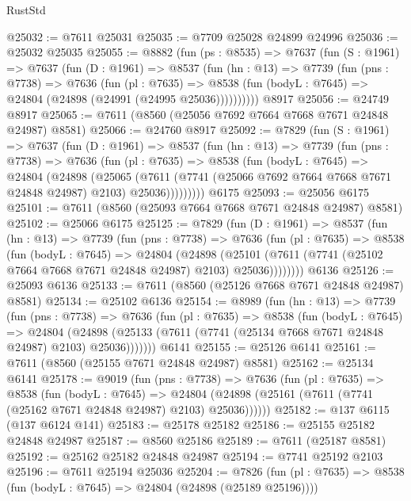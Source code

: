 \begin{lexlean}{RustStd}
\begin{coremodule}
{\begin{coremodule}
{{{{{{{{{{{{{{{{{{{{{{{{{{{{{{{{{{@25032 := @7611 @25031
@25035 := @7709 @25028 @24899 @24996
@25036 := @25032 @25035
@25055 := @8882
    (fun (ps : @8535) =>
    @7637
      (fun (S : @1961) =>
      @7637
        (fun (D : @1961) =>
        @8537
          (fun (hn : @13) =>
          @7739
            (fun (pns : @7738) =>
            @7636
              (fun (pl : @7635) =>
              @8538 (fun (bodyL : @7645) => @24804 (@24898 (@24991 (@24995 @25036))))))))))
    @8917
@25056 := @24749 @8917
@25065 := @7611 (@8560 (@25056 @7692 @7664 @7668 @7671 @24848 @24987) @8581)
@25066 := @24760 @8917
@25092 := @7829
    (fun (S : @1961) =>
    @7637
      (fun (D : @1961) =>
      @8537
        (fun (hn : @13) =>
        @7739
          (fun (pns : @7738) =>
          @7636
            (fun (pl : @7635) =>
            @8538
              (fun (bodyL : @7645) =>
              @24804
                (@24898
                  (@25065
                    (@7611
                      (@7741 (@25066 @7692 @7664 @7668 @7671 @24848 @24987) @2103)
                      @25036)))))))))
    @6175
@25093 := @25056 @6175
@25101 := @7611 (@8560 (@25093 @7664 @7668 @7671 @24848 @24987) @8581)
@25102 := @25066 @6175
@25125 := @7829
    (fun (D : @1961) =>
    @8537
      (fun (hn : @13) =>
      @7739
        (fun (pns : @7738) =>
        @7636
          (fun (pl : @7635) =>
          @8538
            (fun (bodyL : @7645) =>
            @24804
              (@24898
                (@25101 (@7611 (@7741 (@25102 @7664 @7668 @7671 @24848 @24987) @2103) @25036))))))))
    @6136
@25126 := @25093 @6136
@25133 := @7611 (@8560 (@25126 @7668 @7671 @24848 @24987) @8581)
@25134 := @25102 @6136
@25154 := @8989
    (fun (hn : @13) =>
    @7739
      (fun (pns : @7738) =>
      @7636
        (fun (pl : @7635) =>
        @8538
          (fun (bodyL : @7645) =>
          @24804
            (@24898 (@25133 (@7611 (@7741 (@25134 @7668 @7671 @24848 @24987) @2103) @25036)))))))
    @6141
@25155 := @25126 @6141
@25161 := @7611 (@8560 (@25155 @7671 @24848 @24987) @8581)
@25162 := @25134 @6141
@25178 := @9019
    (fun (pns : @7738) =>
    @7636
      (fun (pl : @7635) =>
      @8538
        (fun (bodyL : @7645) =>
        @24804 (@24898 (@25161 (@7611 (@7741 (@25162 @7671 @24848 @24987) @2103) @25036))))))
@25182 := @137 @6115 (@137 @6124 @141)
@25183 := @25178 @25182
@25186 := @25155 @25182 @24848 @24987
@25187 := @8560 @25186
@25189 := @7611 (@25187 @8581)
@25192 := @25162 @25182 @24848 @24987
@25194 := @7741 @25192 @2103
@25196 := @7611 @25194 @25036
@25204 := @7826
    (fun (pl : @7635) => @8538 (fun (bodyL : @7645) => @24804 (@24898 (@25189 @25196))))
}}}}}}}}}}}}}}}}}}}}}}}}}}}}}}}}}}
\end{coremodule}}
\end{coremodule}
\end{lexlean}
